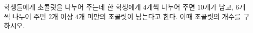 학생들에게 초콜릿을 나누어 주는데 한 학생에게 $4$개씩 나누어 주면 $10$개가 남고, $6$개씩 나누어 주면 $2$개 이상 $4$개 미만의 초콜릿이 남는다고 한다. 이때 초콜릿의 개수를 구하시오.
